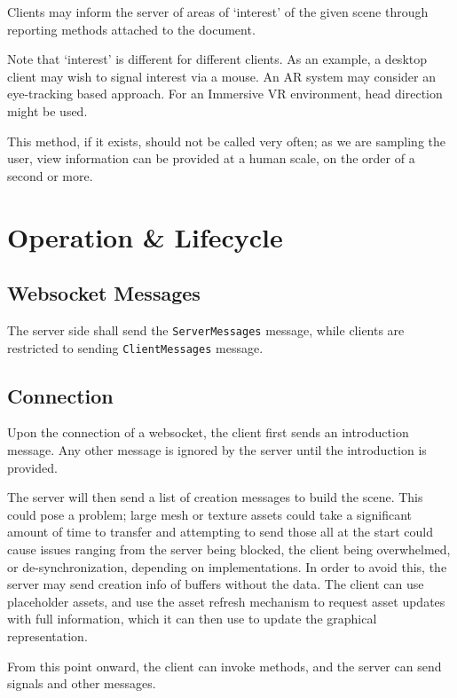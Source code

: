 \documentclass[11pt, oneside]{amsart}
\begin{document}
Clients may inform the server of areas of `interest' of the given scene through reporting methods attached to the document.



Note that `interest' is different for different clients. As an example, a desktop client may wish to signal interest via a mouse. An AR system may consider an eye-tracking based approach. For an Immersive VR environment, head direction might be used.

This method, if it exists, should not be called very often; as we are sampling the user, view information can be provided at a human scale, on the order of a second or more.


\section{Operation \& Lifecycle}

\subsection{Websocket Messages}
The server side shall send the \texttt{ServerMessages} message, while clients are restricted to sending \texttt{ClientMessages} message.

\subsection{Connection}
Upon the connection of a websocket, the client first sends an introduction message. Any other message is ignored by the server until the introduction is provided.

The server will then send a list of creation messages to build the scene. This could pose a problem; large mesh or texture assets could take a significant amount of time to transfer and attempting to send those all at the start could cause issues ranging from the server being blocked, the client being overwhelmed, or de-synchronization, depending on implementations. In order to avoid this, the server may send creation info of buffers without the data. The client can use placeholder assets, and use the asset refresh mechanism to request asset updates with full information, which it can then use to update the graphical representation.

From this point onward, the client can invoke methods, and the server can send signals and other messages.
\end{document}
